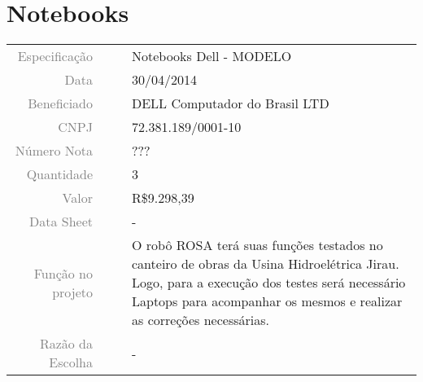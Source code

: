 




\section{Notebooks}
\label{notebook}


\begin{table}[ht!]

	\begin{tabular}{r l|l p{12cm} }
		
		\textcolor{gray}{Especificação} &&& 	{Notebooks Dell - MODELO}\\
		\textcolor{gray}{Data} &&& 				{30/04/2014}\\
        \textcolor{gray}{Beneficiado} &&&		{DELL Computador do Brasil LTD} \\
        \textcolor{gray}{CNPJ} &&& 				{72.381.189/0001-10} \\
        \textcolor{gray}{Número Nota} &&& 		{???} \\
		\textcolor{gray}{Quantidade} &&& 		{3} \\
		\textcolor{gray}{Valor} &&& 			{R\$9.298,39} \\
		\textcolor{gray}{Data Sheet} &&& 		{-} \\

		\textcolor{gray}{Função no projeto} &&& {O robô ROSA terá suas funções testados no canteiro de obras da Usina Hidroelétrica Jirau. Logo, para a execução dos testes será necessário Laptops para acompanhar os mesmos e realizar as correções necessárias.  } \\
		\textcolor{gray}{Razão da Escolha} &&& {-}

	\end{tabular}
\end{table}

